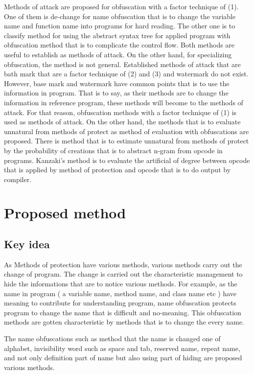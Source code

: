 \documentclass[conference]{IEEEtran}
\begin{document}
Methods of attack are proposed for obfuscation with a factor technique
of (1).  One of them is de-change for name obfuscation that is to
change the variable name and function name into programs for hard
reading\cite{cimato05jss}.  The other one is to classify method for
using the abstract syntax tree for applied program with obfuscation
method that is to complicate the control flow.  Both methods are
useful to establish as methods of attack.  On the other hand, for
specializing obfuscation, the method is not general.  Established
methods of attack that are bath mark that are a factor technique of
(2) and (3) and watermark do not exist.  However, base mark and
watermark have common points that is to use the information in
program.  That is to say, as their methods are to change the
information in reference program, these methods will become to the
methods of attack.  For that reason, obfuscation methods with a factor
technique of (1) is used as methods of attack\cite{tian13hpcc}.  On
the other hand, the methods that is to evaluate unnatural from methods
of protect as method of evaluation with obfuscations are
proposed\cite{kanzaki14ipsj}.  There is method that is to estimate
unnatural from methods of protect by the probability of creations that
is to abstract n-gram from opcode in programs.  Kanzaki's method is to
evaluate the artificial of degree between opcode that is applied by
method of protection and opcode that is to do output by compiler.

\section{Proposed method}

\subsection{Key idea}

As Methods of protection have various methods, various methods carry
out the change of program.  The change is carried out the
characteristic management to hide the informations that are to notice
various methods.  For example, as the name in program ( a variable
name, method name, and class name etc ) have meaning to contribute for
understanding program, name obfuscation\cite{tyma00patent} protects
program to change the name that is difficult and no-meaning.  This
obfuscation methods are gotten characteristic by methods that is to
change the every name.

The name obfuscations such as method that the name is changed one of
alphabet, invisibility word such as space and tab, reserved name,
repeat name\cite{dasho}, and not only definition part of name but also
using part of hiding are proposed various methods\cite{tamada07ieice}.
\end{document}
